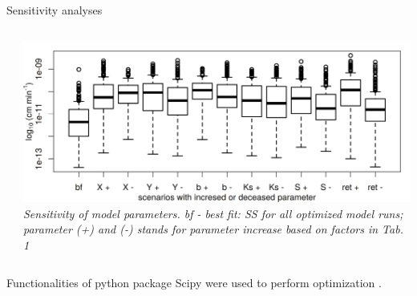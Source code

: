 \begin{block}{Sensitivity analyses}
\begin{columns}
\begin{column}{0.25\textwidth}
\begin{table}[]
        \end{table}
    \end{column}
    \begin{column}{0.5\textwidth}
        \includegraphics[width = \textwidth]{obr/sens.png}
        {\it Sensitivity of model parameters. bf - best fit: SS for all optimized model runs; parameter (+) and (-) stands for parameter increase based on factors in Tab. 1}
    \end{column}
\end{columns}
Functionalities of python package Scipy were used to perform optimization \citep{scipy}.
\end{block}

% 

